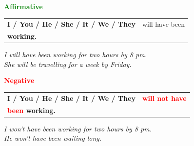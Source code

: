 \documentclass[a4paper,10pt]{article}
\newcommand{\sectiontitle}[2]{%
  {\large\bfseries\textcolor{#1}{#2}}%
}
\begin{document}
\begin{minipage}[t]{.485\textwidth}
\begin{greenbox}
  \sectiontitle{Green}{Affirmative}

  \vspace{0.75mm}
  \begin{tabular}{@{}>{\bfseries}l l@{}}
    I / You / He / She / It / We / They & will have been\\working.\\
    
  \end{tabular}

  \vspace{0.75mm}
  \textit{I will have been working for two hours by 8 pm.}\\[-1mm]
  \textit{She will be travelling for a week by Friday.}
\end{greenbox}
\end{minipage}
\hfill
\begin{minipage}[t]{.485\textwidth}
\begin{redbox}
  \sectiontitle{Red}{Negative}

  \vspace{0.75mm}
  \begin{tabular}{@{}>{\bfseries}l l@{}}
    I / You / He / She / It / We / They & \textcolor{Red}{\bfseries will not have}\\\textcolor{Red}{ been} working.\\
    
  \end{tabular}

  \vspace{0.75mm}
  \textit{I won't have been working for two hours by 8 pm.}\\[-1mm]
  \textit{He won't have been waiting long.}
\end{redbox}
\end{minipage}

\vspace{1.35mm}
\end{document}
